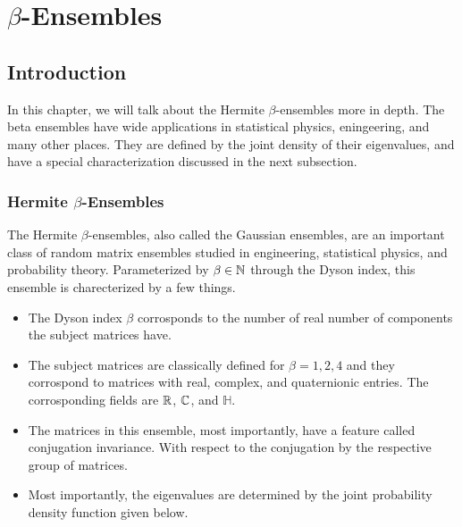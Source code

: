 
\chapter{$\beta$-Ensembles}

\section{Introduction}

In this chapter, we will talk about the Hermite $\beta$-ensembles more in depth. The beta ensembles have wide applications in statistical physics, eningeering, and many other places. They are defined by the joint density of their eigenvalues, and have a special characterization discussed in the next subsection.


\subsection{Hermite $\beta$-Ensembles}

The Hermite $\beta$-ensembles, also called the Gaussian ensembles, are an important class of random matrix ensembles studied in engineering, statistical physics, and probability theory. Parameterized by $\beta \in \mathbb{N}$ through the Dyson index, this ensemble is charecterized by a few things.

\begin{itemize}
  \item The Dyson index $\beta$ corrosponds to the number of real number of components the subject matrices have.
  \item The subject matrices are classically defined for $\beta = 1,2,4$ and they corrospond to matrices with real, complex, and quaternionic entries. The corrosponding fields are $\mathbb{R}$, $\mathbb{C}$, and $\mathbb{H}$.
  \item The matrices in this ensemble, most importantly, have a feature called conjugation invariance. With respect to the conjugation by the respective group of matrices.
  \item Most importantly, the eigenvalues are determined by the joint probability density function given below.
\end{itemize}

